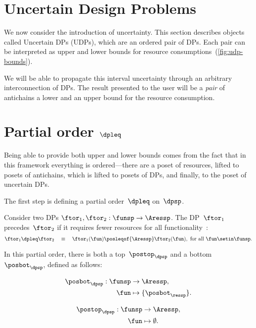 \section{Uncertain Design Problems}
\label{sec:UDP}

We now consider the introduction of uncertainty.
This section describes
objects called Uncertain DPs (UDPs), which are an ordered pair of
DPs.
Each pair can be interpreted as upper and lower bounds for resource
consumptions~(\cref{fig:udp-bounds}).


We will be able to propagate this interval uncertainty through an
arbitrary interconnection of DPs.
The result presented to the user
will be a \emph{pair} of antichains \textemdash{} a lower and an upper
bound for the resource consumption.

\section{Partial order $\dpleq$}

Being able to provide both upper and lower bounds comes from the fact
that in this framework everything is ordered---there are
a poset of resources, lifted to posets of antichains, which is lifted
to posets of DPs, and finally, to the poset of uncertain DPs.

The first step is defining a partial order~$\dpleq$ on~$\dpsp$.
\begin{definition}
    Consider two DPs $\ftor_{1},\ftor_{2}:\funsp\rightarrow\Aressp$.
    The DP~$\ftor_{1}$ precedes~$\ftor_{2}$ if it requires fewer resources
    for all functionality~\fun:
    \[
        \ftor_{1}\dpleq\ftor_{2}\quad\equiv\quad\ftor_{1}(\fun)\posleqof{\Aressp}\ftor_{2}(\fun),\ \text{for all }\fun\setin\funsp.
    \]
\end{definition}

In this partial order, there is both a top~$\postop_{\dpsp}$ and a
bottom~$\posbot_{\dpsp}$, defined as follows:

\vspace{-5mm}

\begin{minipage}[t]{0.4\columnwidth}
    \begin{align*}
        \posbot_{\dpsp}:\funsp & \rightarrow\Aressp, \\
        \fun                   & \mapsto\{\posbot_{\ressp}\}.
    \end{align*}

\end{minipage}
\begin{minipage}[t]{0.4\columnwidth}
    \begin{align}
        \postop_{\dpsp}:\funsp & \rightarrow\Aressp,\nonumber \\
        \fun                   & \mapsto\emptyset.\label{eq:top}
    \end{align}

\end{minipage}


